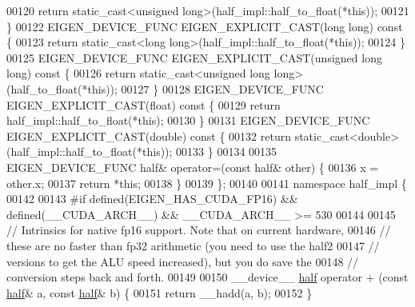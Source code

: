 \begin{DoxyCode}
00120     \textcolor{keywordflow}{return} \textcolor{keyword}{static\_cast<}\textcolor{keywordtype}{unsigned} \textcolor{keywordtype}{long}\textcolor{keyword}{>}(half\_impl::half\_to\_float(*\textcolor{keyword}{this}));
00121   \}
00122   EIGEN\_DEVICE\_FUNC EIGEN\_EXPLICIT\_CAST(\textcolor{keywordtype}{long} \textcolor{keywordtype}{long})\textcolor{keyword}{ const }\{
00123     \textcolor{keywordflow}{return} \textcolor{keyword}{static\_cast<}\textcolor{keywordtype}{long} \textcolor{keywordtype}{long}\textcolor{keyword}{>}(half\_impl::half\_to\_float(*\textcolor{keyword}{this}));
00124   \}
00125   EIGEN\_DEVICE\_FUNC EIGEN\_EXPLICIT\_CAST(\textcolor{keywordtype}{unsigned} \textcolor{keywordtype}{long} \textcolor{keywordtype}{long})\textcolor{keyword}{ const }\{
00126     \textcolor{keywordflow}{return} \textcolor{keyword}{static\_cast<}\textcolor{keywordtype}{unsigned} \textcolor{keywordtype}{long} \textcolor{keywordtype}{long}\textcolor{keyword}{>}(half\_to\_float(*\textcolor{keyword}{this}));
00127   \}
00128   EIGEN\_DEVICE\_FUNC EIGEN\_EXPLICIT\_CAST(\textcolor{keywordtype}{float})\textcolor{keyword}{ const }\{
00129     \textcolor{keywordflow}{return} half\_impl::half\_to\_float(*\textcolor{keyword}{this});
00130   \}
00131   EIGEN\_DEVICE\_FUNC EIGEN\_EXPLICIT\_CAST(\textcolor{keywordtype}{double})\textcolor{keyword}{ const }\{
00132     \textcolor{keywordflow}{return} \textcolor{keyword}{static\_cast<}\textcolor{keywordtype}{double}\textcolor{keyword}{>}(half\_impl::half\_to\_float(*\textcolor{keyword}{this}));
00133   \}
00134 
00135   EIGEN\_DEVICE\_FUNC half& operator=(\textcolor{keyword}{const} half& other) \{
00136     x = other.x;
00137     \textcolor{keywordflow}{return} *\textcolor{keyword}{this};
00138   \}
00139 \};
00140 
00141 \textcolor{keyword}{namespace }half\_impl \{
00142 
00143 \textcolor{preprocessor}{#if defined(EIGEN\_HAS\_CUDA\_FP16) && defined(\_\_CUDA\_ARCH\_\_) && \_\_CUDA\_ARCH\_\_ >= 530}
00144 
00145 \textcolor{comment}{// Intrinsics for native fp16 support. Note that on current hardware,}
00146 \textcolor{comment}{// these are no faster than fp32 arithmetic (you need to use the half2}
00147 \textcolor{comment}{// versions to get the ALU speed increased), but you do save the}
00148 \textcolor{comment}{// conversion steps back and forth.}
00149 
00150 \_\_device\_\_ \hyperlink{struct_eigen_1_1half}{half} operator + (\textcolor{keyword}{const} \hyperlink{struct_eigen_1_1half}{half}& a, \textcolor{keyword}{const} \hyperlink{struct_eigen_1_1half}{half}& b) \{
00151   \textcolor{keywordflow}{return} \_\_hadd(a, b);
00152 \}

\end{DoxyCode}
